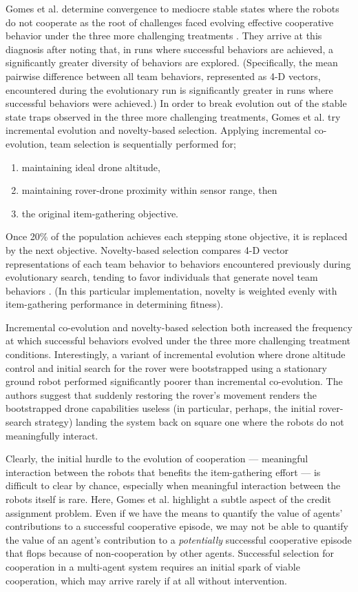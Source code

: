 Gomes et al. determine convergence to mediocre stable states where the robots do not cooperate as the root of challenges faced evolving effective cooperative behavior under the three more challenging treatments \cite{panait2010theoretical}.
They arrive at this diagnosis after noting that, in runs where successful behaviors are achieved, a significantly greater diversity of behaviors are explored.
(Specifically, the mean pairwise difference between all team behaviors, represented as 4-D vectors, encountered during the evolutionary run is significantly greater in runs where successful behaviors were achieved.)
In order to break evolution out of the stable state traps observed in the three more challenging treatments, Gomes et al. try incremental evolution and novelty-based selection.
Applying incremental co-evolution, team selection is sequentially performed for;
\begin{enumerate}
\item maintaining ideal drone altitude,
\item maintaining rover-drone proximity within sensor range, then
\item the original item-gathering objective.
\end{enumerate}
Once 20\% of the population achieves each stepping stone objective, it is replaced by the next objective.
Novelty-based selection compares 4-D vector representations of each team behavior to behaviors encountered previously during evolutionary search, tending to favor individuals that generate novel team behaviors \cite{lehman2008exploiting}.
(In this particular implementation, novelty is weighted evenly with item-gathering performance in determining fitness).

Incremental co-evolution and novelty-based selection both increased the frequency at which successful behaviors evolved under the three more challenging treatment conditions.
Interestingly, a variant of incremental evolution where drone altitude control and initial search for the rover were bootstrapped using a stationary ground robot performed significantly poorer than incremental co-evolution.
The authors suggest that suddenly restoring the rover's movement renders the bootstrapped drone capabilities useless (in particular, perhaps, the initial rover-search strategy) landing the system back on square one where the robots do not meaningfully interact.

Clearly, the initial hurdle to the evolution of cooperation --- meaningful interaction between the robots that benefits the item-gathering effort --- is difficult to clear by chance, especially when meaningful interaction between the robots itself is rare.
Here, Gomes et al. highlight a subtle aspect of the credit assignment problem.
Even if we have the means to quantify the value of agents' contributions to a successful cooperative episode, we may not be able to quantify the value of an agent's contribution to a \textit{potentially} successful cooperative episode that flops because of non-cooperation by other agents.
Successful selection for cooperation in a multi-agent system requires an initial spark of viable cooperation, which may arrive rarely if at all without intervention.

